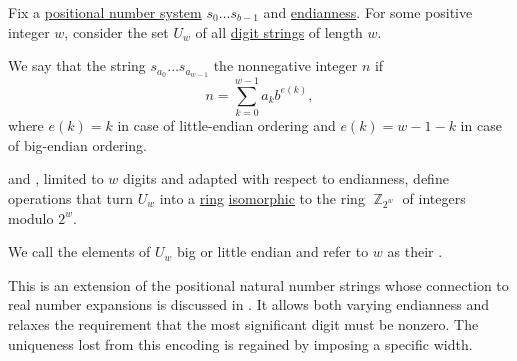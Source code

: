 \begin{definition}\label{def:ring_of_unsigned_integers}\mimprovised
  Fix a \hyperref[def:positional_number_system]{positional number system} \( s_0 \ldots s_{b-1} \) and \hyperref[def:endianness]{endianness}. For some positive integer \( w \), consider the set \( U_w \) of all \hyperref[def:positional_number_system]{digit strings} of length \( w \).

  We say that the string \( s_{a_0} \ldots s_{a_{w-1}} \)  the nonnegative integer \( n \) if
  \begin{equation*}
    n = \sum_{k=0}^{w-1} a_k b^{e(k)},
  \end{equation*}
  where \( e(k) = k \) in case of little-endian ordering and \( e(k) = w - 1 - k \) in case of big-endian ordering.

   and , limited to \( w \) digits and adapted with respect to endianness, define operations that turn \( U_w \) into a \hyperref[def:ring]{ring} \hyperref[def:algebra_over_semiring/homomorphism]{isomorphic} to the ring \hyperref[def:ring_of_integers_modulo]{\( \BbbZ_{2^w} \)} of integers modulo \( 2^w \).

  We call the elements of \( U_w \) big or little endian  and refer to \( w \) as their .
\end{definition}
\begin{comments}
  \item This is an extension of the positional natural number strings whose connection to real number expansions is discussed in . It allows both varying endianness and relaxes the requirement that the most significant digit must be nonzero. The uniqueness lost from this encoding is regained by imposing a specific width.
\end{comments}
